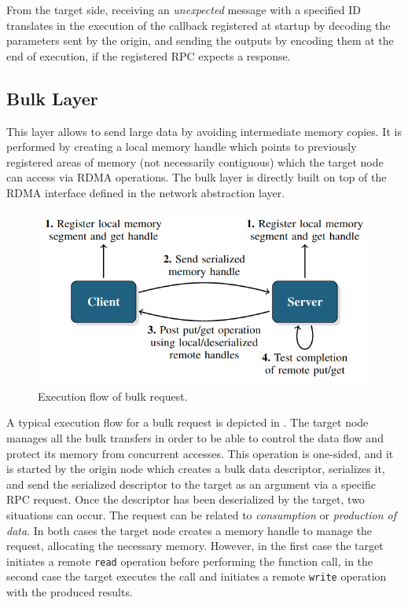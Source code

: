 From the target side, receiving an \textit{unexpected} message with a specified ID translates in the execution of the callback registered at startup by decoding the parameters sent by the origin, and sending the outputs by encoding them at the end of execution, if the registered RPC expects a response.
\subsection{Bulk Layer}
This layer allows to send large data by avoiding intermediate memory copies. It is performed by creating a local memory handle which points to previously registered areas of memory (not necessarily contiguous) which the target node can access via RDMA operations. The bulk layer is directly built on top of the RDMA interface defined in the network abstraction layer. \newline

\begin{figure}[H]
    \centering
    \includegraphics[width=0.6\linewidth]{res/bulk-flow.png}
    \caption{Execution flow of bulk request.}
    \label{fig:bulk-flow}
\end{figure}

A typical execution flow for a bulk request is depicted in . The target node manages all the bulk transfers in order to be able to control the data flow and protect its memory from concurrent accesses. This operation is one-sided, and it is started by the origin node which creates a bulk data descriptor, serializes it, and send the serialized descriptor to the target as an argument via a specific RPC request. Once the descriptor has been deserialized by the target, two situations can occur. The request can be related to \textit{consumption} or \textit{production of data}. In both cases the target node creates a memory handle to manage the request, allocating the necessary memory. However, in the first case the target initiates a remote \texttt{read} operation before performing the function call, in the second case the target executes the call and initiates a remote \texttt{write} operation with the produced results.\newline

